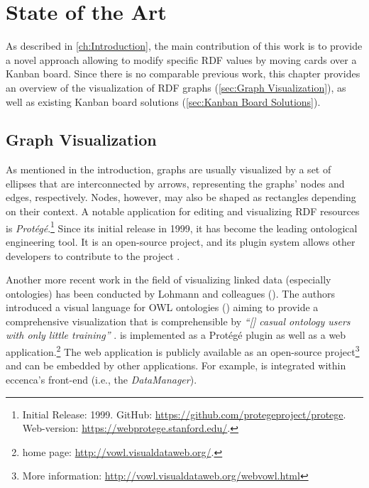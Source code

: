\chapter{State of the Art}
\label{ch:State of the Art}

As described in \autoref{ch:Introduction}, the main contribution of this work is to provide a novel approach allowing to modify specific \acrshort*{RDF} values by moving cards over a Kanban board. Since there is no comparable previous work, this chapter provides an overview of the visualization of \acrshort*{RDF} graphs (\autoref{sec:Graph Visualization}), as well as existing Kanban board solutions (\autoref{sec:Kanban Board Solutions}).

\section{Graph Visualization}\label{sec:Graph Visualization}

As mentioned in the introduction, graphs are usually visualized by a set of ellipses that are interconnected by arrows, representing the graphs’ nodes and edges, respectively. Nodes, however, may also be shaped as rectangles depending on their context. A notable application for editing and visualizing RDF resources is \textit{Protégé}.\footnote{Initial Release: 1999. GitHub: \url{https://github.com/protegeproject/protege}. Web-version: \url{https://webprotege.stanford.edu/}.} Since its initial release in 1999, it has become the leading ontological engineering tool. It is an open-source project, and its plugin system allows other developers to contribute to the project \parencite[62]{Gasevic2009}.

Another more recent work in the field of visualizing linked data (especially ontologies) has been conducted by Lohmann and colleagues (\citeyear{Lohmann2016}). The authors introduced a visual language for \acrshort*{OWL} ontologies (\textit{}) aiming to provide a comprehensive visualization that is comprehensible by \textit{“[\textellipsis] casual ontology users with only little training”} \parencite[1]{Lohmann2016}.  is implemented as a Protégé plugin as well as a web application.\footnote{ home page: \url{http://vowl.visualdataweb.org/}.} The web application is publicly available as an open-source project\footnote{More information: \url{http://vowl.visualdataweb.org/webvowl.html}} and can be embedded by other applications. For example,  is integrated within eccenca’s front-end (i.e., the \textit{DataManager}).

